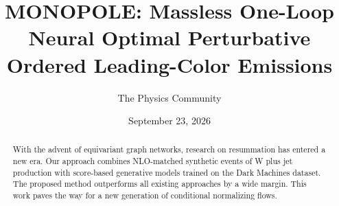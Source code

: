 \documentclass[11pt]{article}
\title{MONOPOLE: Massless One-Loop Neural Optimal Perturbative Ordered Leading-Color Emissions}
\author{The Physics Community}
\date{September 23, 2026}
\numberwithin{equation}{section}
\theoremstyle{definition}
\theoremstyle{remark}
\begin{document}
\maketitle
\begin{abstract}
With the advent of equivariant graph networks, research on resummation
has entered a new era. Our approach combines NLO-matched synthetic
events of W plus jet production with score-based generative models
trained on the Dark Machines dataset. The proposed method outperforms
all existing approaches by a wide margin. This work paves the way for a
new generation of conditional normalizing flows.
\end{abstract}
\tableofcontents






\nocite{*}


\end{document}
